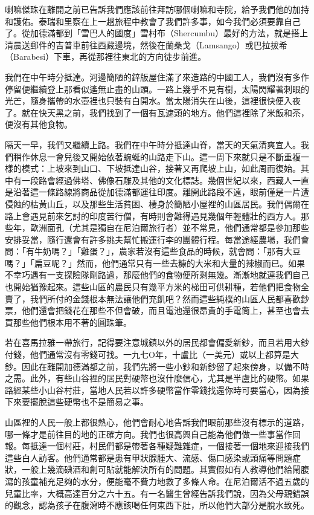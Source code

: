 喇嘛傑珠在離開之前已告訴我們應該前往拜訪哪個喇嘛和寺院，給予我們他的加持和護佑。泰瑞和里察在上一趟旅程中教會了我們許多事，如今我們必須要靠自己了。從加德滿都到「雪巴人的國度」雪村布（Shercumbu）最好的方法，就是搭上清晨送郵件的吉普車前往西藏邊境，然後在蘭桑戈（Lamsango）或巴拉拔希（Barabesi）下車，再從那裡往東北的方向徒步前進。

我們在中午時分抵達。河邊簡陋的鋅版屋住滿了來造路的中國工人，我們沒有多作停留便繼續登上那看似遙無止盡的山頭。一路上幾乎不見有樹，太陽閃耀著刺眼的光芒，隨身攜帶的水壺裡也只裝有白開水。當太陽消失在山後，這裡很快便入夜了。就在快天黑之前，我們找到了一個有瓦遮頭的地方。他們這裡除了米飯和茶，便沒有其他食物。

隔天一早，我們又繼續上路。我們在中午時分抵達山脊，當天的天氣清爽宜人。我們稍作休息一會兒後又開始依著蜿蜒的山路走下山。這一周下來就只是不斷重複一樣的模式：上坡來到山口、下坡抵達山谷，接著又再爬坡上山，如此周而復始。其中有一段路會經過佛塔、佛像石雕及其他的文化標誌。幾個世紀以來，西藏人一直是沿著這一條路線將商品從加德滿都運往印度。離開此路段不遠，眼前僅是一片遭侵蝕的枯黃山丘，以及那些生活貧困、棲身於簡陋小屋裡的山區居民。我們偶爾在路上會遇見前來乞討的印度苦行僧，有時則會難得遇見幾個年輕體壯的西方人。那些年，歐洲面孔（尤其是獨自在尼泊爾旅行者）並不常見，他們通常都是參加那些安排妥當，隨行還會有許多挑夫幫忙搬運行李的團體行程。每當途經農場，我們會問：「有牛奶嗎？」「雞蛋？」，農家若沒有這些食品的時候，就會問：「那有大豆嗎？」「扁豆呢？」然而，他們通常只有一些去糠的大米和大量的辣椒而已。如果不幸巧遇有一支探險隊剛路過，那麼他們的食物便所剩無幾。漸漸地就連我們自己也開始猶豫起來。這些山區的農民只有幾平方米的梯田可供耕種，若他們把食物全賣了，我們所付的金錢根本無法讓他們充飢吧？然而這些純樸的山區人民都喜歡鈔票，他們還會把錢花在那些不但會破，而且電池還很昂貴的手電筒上，甚至也會去買那些他們根本用不著的圓珠筆。

若在喜馬拉雅一帶旅行，記得要注意城鎮以外的居民都會偏愛新鈔，而且若用大鈔付錢，他們通常沒有零錢可找。一九七Ο年，十盧比（一美元）或以上都算是大鈔。因此在離開加德滿都之前，我們先將一些小鈔和新鈔留了起來傍身，以備不時之需。此外，有些山谷裡的居民對硬幣也沒什麼信心，尤其是半盧比的硬幣。如果路經某些小山谷村莊，當地人民若以許多硬幣當作零錢找還你時可要當心，因為接下來要擺脫這些硬幣也不是簡易之事。

山區裡的人民一般上都很熱心，他們會耐心地告訴我們眼前那些沒有標示的道路，哪一條才是前往目的地的正確方向。我們也很高興自己能為他們做一些事當作回報。每抵達一個村莊，村民們都是帶著各種疑難雜症，一個接著一個地來迎接我們這些白人訪客。他們通常都是患有甲狀腺腫大、流感、傷口感染或頭痛等問題症狀，一般上幾滴碘酒和創可貼就能解決所有的問題。其實假如有人教導他們給鬧腹瀉的孩童補充足夠的水分，便能毫不費力地救了多條人命。在尼泊爾活不過五歲的兒童比率，大概高達百分之六十五。有一名醫生曾經告訴我們說，因為父母親錯誤的觀念，認為孩子在腹瀉時不應該喝任何東西下肚，所以他們大部分是脫水致死。

